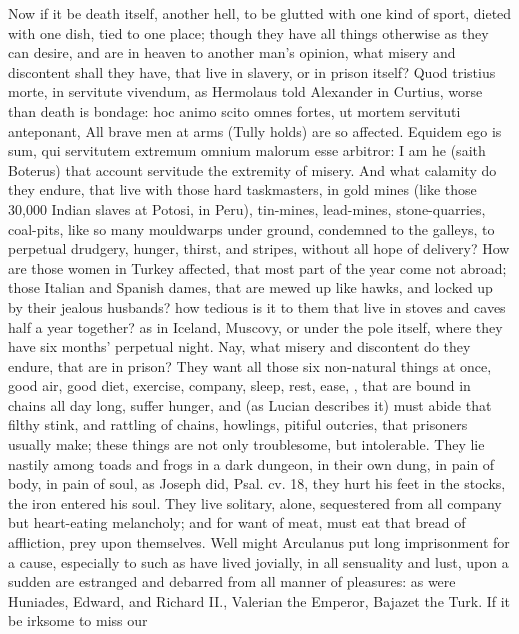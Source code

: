 {Now if it be death itself, another hell, to be glutted with one kind of
sport, dieted with one dish, tied to one place; though they have all
things otherwise as they can desire, and are in heaven to another man's
opinion, what misery and discontent shall they have, that live in
slavery, or in prison itself? Quod tristius morte, in servitute
vivendum, as Hermolaus told Alexander in Curtius, worse than
death is bondage: hoc animo scito omnes fortes, ut mortem
servituti anteponant, All brave men at arms (Tully holds) are so
affected. Equidem ego is sum, qui servitutem extremum omnium
malorum esse arbitror: I am he (saith Boterus) that account servitude
the extremity of misery. And what calamity do they endure, that live
with those hard taskmasters, in gold mines (like those 30,000
Indian slaves at Potosi, in Peru), tin-mines, lead-mines,
stone-quarries, coal-pits, like so many mouldwarps under ground,
condemned to the galleys, to perpetual drudgery, hunger, thirst, and
stripes, without all hope of delivery? How are those women in Turkey
affected, that most part of the year come not abroad; those Italian and
Spanish dames, that are mewed up like hawks, and locked up by their
jealous husbands? how tedious is it to them that live in stoves and
caves half a year together? as in Iceland, Muscovy, or under the
pole itself, where they have six months' perpetual night. Nay,
what misery and discontent do they endure, that are in prison? They
want all those six non-natural things at once, good air, good diet,
exercise, company, sleep, rest, ease, \etc{}, that are bound in chains all
day long, suffer hunger, and (as Lucian describes it) must abide
that filthy stink, and rattling of chains, howlings, pitiful outcries,
that prisoners usually make; these things are not only troublesome, but
intolerable. They lie nastily among toads and frogs in a dark dungeon,
in their own dung, in pain of body, in pain of soul, as Joseph did,
Psal. cv. 18, they hurt his feet in the stocks, the iron entered his
soul. They live solitary, alone, sequestered from all company but
heart-eating melancholy; and for want of meat, must eat that bread of
affliction, prey upon themselves. Well might Arculanus put long
imprisonment for a cause, especially to such as have lived jovially, in
all sensuality and lust, upon a sudden are estranged and debarred from
all manner of pleasures: as were Huniades, Edward, and Richard II.,
Valerian the Emperor, Bajazet the Turk. If it be irksome to miss our
}
